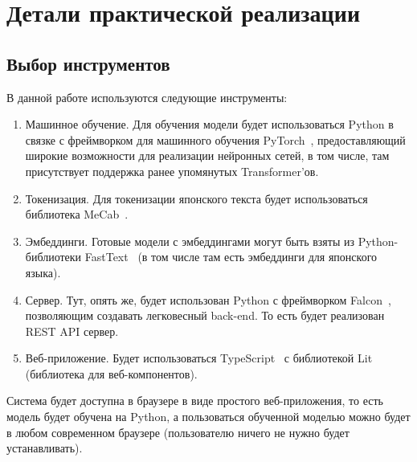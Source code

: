



\chapter{Детали практической реализации}


\section{Выбор инструментов}


В данной работе используются следующие инструменты:
\begin{enumerate}[1.]%
  \item Машинное обучение. Для обучения модели будет использоваться Python в связке с фреймворком для машинного обучения PyTorch~\cite{PyTorch}, предоставляющий широкие возможности для реализации нейронных сетей, в том числе, там присутствует поддержка ранее упомянутых Transformer'ов.
  \item Токенизация. Для токенизации японского текста будет использоваться библиотека MeCab~\cite{MeCab}.
  \item Эмбеддинги. Готовые модели с эмбеддингами могут быть взяты из Python-библиотеки FastText~\cite{FastText} (в том числе там есть эмбеддинги для японского языка).
  \item Сервер. Тут, опять же, будет использован Python с фреймворком Falcon~\cite{Falcon}, позволяющим создавать легковесный back-end. То есть будет реализован REST API сервер.
  \item Веб-приложение. Будет использоваться TypeScript~\cite{TypeScript} с библиотекой Lit~\cite{Lit} (библиотека для веб-компонентов).
\end{enumerate}

Система будет доступна в браузере в виде простого веб-приложения, то есть модель будет обучена на Python, а пользоваться обученной моделью можно будет в любом современном браузере (пользователю ничего не нужно будет устанавливать).


